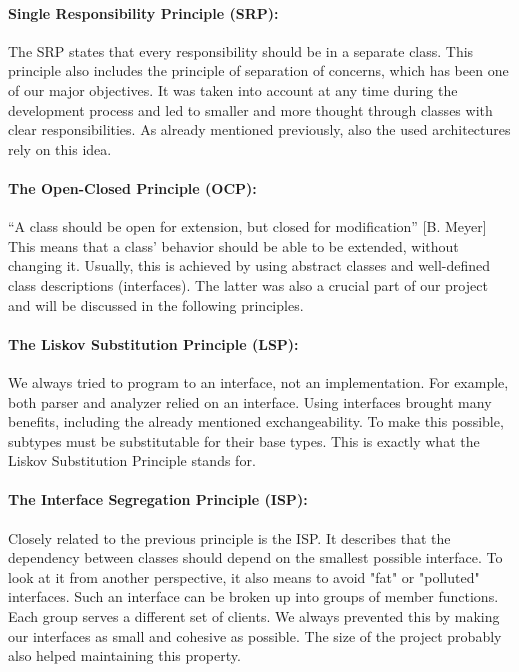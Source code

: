 \paragraph{Single Responsibility Principle (SRP):}
The SRP states that every responsibility should be in a separate class. This principle also includes the principle of separation of concerns, which has been one of our major objectives. It was taken into account at any time during the development process and led to smaller and more thought through classes with clear responsibilities. As already mentioned previously, also the used architectures rely on this idea.
\paragraph{The Open-Closed Principle (OCP):}
``A class should be open for extension, but closed for modification'' [B. Meyer]\\
This means that a class' behavior should be able to be extended, without changing it. Usually, this is achieved by using abstract classes and well-defined class descriptions (interfaces). The latter was also a crucial part of our project and will be discussed in the following principles.
\paragraph{The Liskov Substitution Principle (LSP):}
We always tried to program to an interface, not an implementation. For example, both parser and analyzer relied on an interface. Using interfaces brought many benefits, including the already mentioned exchangeability. To make this possible, subtypes must be substitutable for their base types. This is exactly what the Liskov Substitution Principle stands for. 
\paragraph{The Interface Segregation Principle (ISP):}
Closely related to the previous principle is the ISP. It describes that the dependency between classes should depend on the smallest possible interface. To look at it from another perspective, it also means to avoid "fat" or "polluted" interfaces. Such an interface can be broken up into groups of member functions. Each group serves a different set of clients. We always prevented this by making our interfaces as small and cohesive as possible. The size of the project probably also helped maintaining this property.
